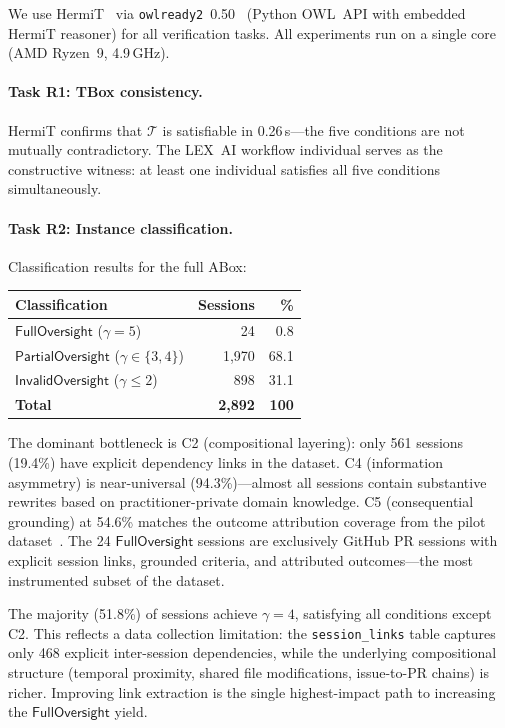 \documentclass[11pt]{article}
\newcommand{\TBox}{\ensuremath{\mathcal{T}}\xspace}
\begin{document}
We use HermiT~\citep{glimm2014hermit} via \texttt{owlready2}~0.50~\citep{lamy2017owlready} (Python OWL~API with embedded HermiT reasoner) for all verification tasks.
All experiments run on a single core (AMD Ryzen~9, 4.9\,GHz).

\paragraph{Task R1: TBox consistency.}
HermiT confirms that \TBox is satisfiable in 0.26\,s---the five conditions are not mutually contradictory.
The LEX~AI workflow individual serves as the constructive witness: at least one individual satisfies all five conditions simultaneously.

\paragraph{Task R2: Instance classification.}
Classification results for the full ABox:

\begin{center}
\begin{tabular}{@{}lrr@{}}
\toprule
\textbf{Classification} & \textbf{Sessions} & \textbf{\%} \\
\midrule
$\mathsf{FullOversight}$    ($\gamma = 5$) & 24 & 0.8 \\
$\mathsf{PartialOversight}$ ($\gamma \in \{3,4\}$) & 1{,}970 & 68.1 \\
$\mathsf{InvalidOversight}$ ($\gamma \leq 2$) & 898 & 31.1 \\
\midrule
\textbf{Total} & \textbf{2{,}892} & \textbf{100} \\
\bottomrule
\end{tabular}
\end{center}

The dominant bottleneck is C2 (compositional layering): only 561 sessions (19.4\%) have explicit dependency links in the dataset.
C4 (information asymmetry) is near-universal (94.3\%)---almost all sessions contain substantive rewrites based on practitioner-private domain knowledge.
C5 (consequential grounding) at 54.6\% matches the outcome attribution coverage from the pilot dataset~\citep{ovcharov2026edittrace}.
The 24 $\mathsf{FullOversight}$ sessions are exclusively GitHub PR sessions with explicit session links, grounded criteria, and attributed outcomes---the most instrumented subset of the dataset.

The majority (51.8\%) of sessions achieve $\gamma = 4$, satisfying all conditions except C2.
This reflects a data collection limitation: the \texttt{session\_links} table captures only 468 explicit inter-session dependencies, while the underlying compositional structure (temporal proximity, shared file modifications, issue-to-PR chains) is richer.
Improving link extraction is the single highest-impact path to increasing the $\mathsf{FullOversight}$ yield.
\end{document}

